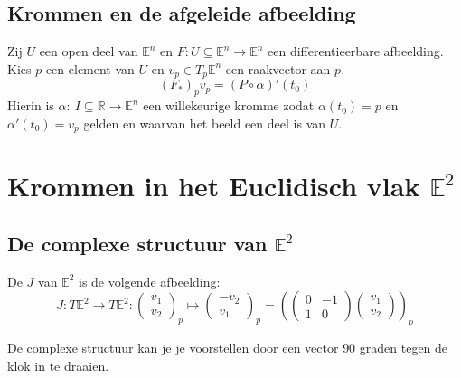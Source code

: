 \documentclass[main.tex]{subfiles}
\begin{document}
\section{Krommen en de afgeleide afbeelding}
\label{sec:krommen-en-de}


\begin{st}
  Zij $U$ een open deel van $\mathbb{E}^{n}$ en $F: U \subseteq \mathbb{E}^{n} \rightarrow \mathbb{E}^{n}$ een differentieerbare afbeelding.
  Kies $p$ een element van $U$ en $v_{p}\in T_{p}\mathbb{E}^{n}$ een raakvector aan $p$.
  \[ (F_{*})_{p}v_{p} = (P \circ \alpha)'(t_{0}) \]
  Hierin is $\alpha:\ I \subseteq \mathbb{R} \rightarrow \mathbb{E}^{n}$ een willekeurige kromme zodat $\alpha(t_{0}) = p$ en $\alpha'(t_{0}) = v_{p}$ gelden en waarvan het beeld een deel is van $U$.
\end{st}


\chapter{Krommen in het Euclidisch vlak $\mathbb{E}^{2}$}
\label{cha:kromm-het-eucl}

\section{De complexe structuur van $\mathbb{E}^{2}$}
\label{sec:de-compl-struct}

\begin{de}
  De  $J$ van $\mathbb{E}^{2}$ is de volgende afbeelding:
  \[
  J: T\mathbb{E}^{2} \rightarrow T\mathbb{E}^{2}: 
  \begin{pmatrix}
    v_{1}\\v_{2}
  \end{pmatrix}_{p}
  \mapsto
  \begin{pmatrix}
    -v_{2}\\v_{1}
  \end{pmatrix}_{p}
  =
  \left(
    \begin{pmatrix}
      0 & -1\\
      1 & 0
    \end{pmatrix}
    \begin{pmatrix}
      v_{1}\\v_{2}
    \end{pmatrix}
  \right)_{p}
  \]
\end{de}

\begin{opm}
  De complexe structuur kan je je voorstellen door een vector $90$ graden tegen de klok in te draaien.
\end{opm}
\end{document}
